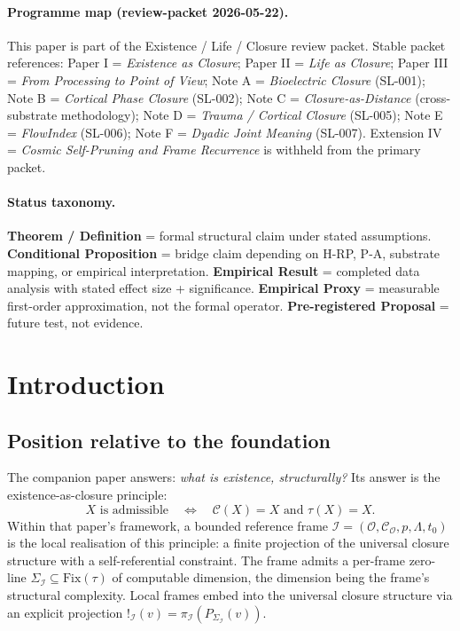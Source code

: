 \documentclass[11pt]{article}
\theoremstyle{plain}
\theoremstyle{definition}
\theoremstyle{remark}
\newcommand{\Fix}{\mathrm{Fix}}
\newcommand{\Ical}{\mathcal{I}}
\newcommand{\Ocal}{\mathcal{O}}
\newcommand{\Ccal}{\mathcal{C}}
\begin{document}
\paragraph{Programme map (review-packet 2026-05-22).}
This paper is part of the Existence / Life / Closure review packet. Stable packet references:
Paper I = \emph{Existence as Closure};
Paper II = \emph{Life as Closure};
Paper III = \emph{From Processing to Point of View};
Note A = \emph{Bioelectric Closure} (SL-001);
Note B = \emph{Cortical Phase Closure} (SL-002);
Note C = \emph{Closure-as-Distance} (cross-substrate methodology);
Note D = \emph{Trauma / Cortical Closure} (SL-005);
Note E = \emph{FlowIndex} (SL-006);
Note F = \emph{Dyadic Joint Meaning} (SL-007).
Extension IV = \emph{Cosmic Self-Pruning and Frame Recurrence} is withheld from the primary packet.

\paragraph{Status taxonomy.}
\textbf{Theorem / Definition} = formal structural claim under stated assumptions.
\textbf{Conditional Proposition} = bridge claim depending on H-RP, P-A, substrate mapping, or empirical interpretation.
\textbf{Empirical Result} = completed data analysis with stated effect size + significance.
\textbf{Empirical Proxy} = measurable first-order approximation, not the formal operator.
\textbf{Pre-registered Proposal} = future test, not evidence.



\section{Introduction}\label{sec:intro}

\subsection{Position relative to the foundation}

The companion paper \citet{SmartExistenceClosure} answers: \emph{what is existence, structurally?} Its answer is the existence-as-closure principle:
\[
  X \text{ is admissible} \quad\Longleftrightarrow\quad \Ccal(X) = X \text{ and } \tau(X) = X.
\]
Within that paper's framework, a bounded reference frame $\Ical = (\Ocal, \Ccal_\Ocal, p, \Lambda, t_0)$ is the local realisation of this principle: a finite projection of the universal closure structure with a self-referential constraint. The frame admits a per-frame zero-line $\Sigma_\Ical \subseteq \Fix(\tau)$ of computable dimension, the dimension being the frame's structural complexity. Local frames embed into the universal closure structure via an explicit projection $!_\Ical(v) = \pi_\Ical(P_{\Sigma_\Ical}(v))$.
\end{document}
